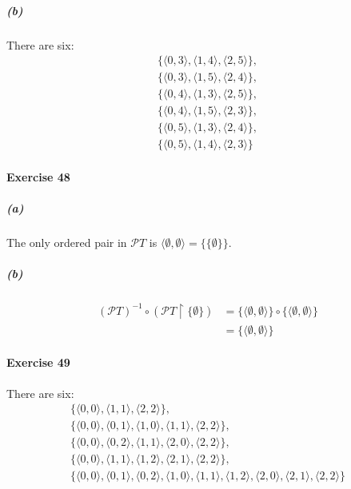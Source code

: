 \documentclass{report}
\begin{document}
    \subparagraph{(b)}
    There are six:
    \begin{align*}
        \{ \langle 0,3 \rangle, \langle 1, 4 \rangle, \langle 2, 5 \rangle \}, \\
        \{ \langle 0,3 \rangle, \langle 1, 5 \rangle, \langle 2, 4 \rangle \}, \\
        \{ \langle 0,4 \rangle, \langle 1, 3 \rangle, \langle 2, 5 \rangle \}, \\
        \{ \langle 0,4 \rangle, \langle 1, 5 \rangle, \langle 2, 3 \rangle \}, \\
        \{ \langle 0,5 \rangle, \langle 1, 3 \rangle, \langle 2, 4 \rangle \}, \\
        \{ \langle 0,5 \rangle, \langle 1, 4 \rangle, \langle 2, 3 \rangle \}
    \end{align*}

    \paragraph{Exercise 48}
    \subparagraph{(a)}
    The only ordered pair in $\mathcal{P} T$ is $\langle \emptyset, \emptyset \rangle = \{ \{ \emptyset \} \}$.

    \subparagraph{(b)}
    \begin{align*}
        (\mathcal{P} T)^{-1} \circ (\mathcal{P} T \restriction \{ \emptyset \})
        & = \{ \langle \emptyset, \emptyset \rangle \} \circ \{ \langle \emptyset, \emptyset \rangle \} \\
        & = \{ \langle \emptyset, \emptyset \rangle \}
    \end{align*}

    \paragraph{Exercise 49}
    There are six:
    \begin{align*}
        \{ \langle 0,0 \rangle, \langle 1,1 \rangle, \langle 2,2 \rangle \}, \\
        \{ \langle 0,0 \rangle, \langle 0,1 \rangle, \langle 1,0 \rangle, \langle 1,1 \rangle, \langle 2,2 \rangle \}, \\
        \{ \langle 0,0 \rangle, \langle 0,2 \rangle, \langle 1,1 \rangle, \langle 2,0 \rangle, \langle 2,2 \rangle \}, \\
        \{ \langle 0,0 \rangle, \langle 1,1 \rangle, \langle 1,2 \rangle, \langle 2,1 \rangle, \langle 2,2 \rangle \}, \\
        \{ \langle 0,0 \rangle, \langle 0,1 \rangle, \langle 0,2 \rangle,
        \langle 1,0 \rangle, \langle 1,1 \rangle, \langle 1,2 \rangle,
        \langle 2,0 \rangle, \langle 2,1 \rangle, \langle 2,2 \rangle \}
    \end{align*}
\end{document}
